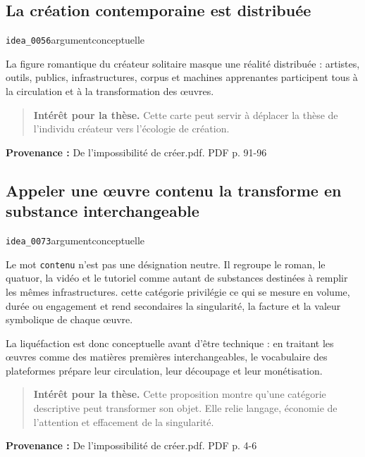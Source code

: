 \documentclass[10pt,a4paper]{article}
\begin{document}
\subsection{La création contemporaine est distribuée}
{\small\color{metadata} \texttt{idea\_0056}\quad\textbullet\quad argument\quad\textbullet\quad conceptuelle\par}

La figure romantique du créateur solitaire masque une réalité distribuée : artistes, outils, publics, infrastructures, corpus et machines apprenantes participent tous à la circulation et à la transformation des œuvres.

\begin{quote}
\textbf{Intérêt pour la thèse.} Cette carte peut servir à déplacer la thèse de l'individu créateur vers l'écologie de création.
\end{quote}
{\footnotesize\color{metadata}\textbf{Provenance :} De l'impossibilité de créer.pdf. PDF p. 91-96\par}

\subsection{Appeler une œuvre contenu la transforme en substance interchangeable}
{\small\color{metadata} \texttt{idea\_0073}\quad\textbullet\quad argument\quad\textbullet\quad conceptuelle\par}

Le mot \texttt{contenu} n'est pas une désignation neutre. Il regroupe le roman, le quatuor, la vidéo et le tutoriel comme autant de substances destinées à remplir les mêmes infrastructures. cette catégorie privilégie ce qui se mesure en volume, durée ou engagement et rend secondaires la singularité, la facture et la valeur symbolique de chaque œuvre.

La liquéfaction est donc conceptuelle avant d'être technique : en traitant les œuvres comme des matières premières interchangeables, le vocabulaire des plateformes prépare leur circulation, leur découpage et leur monétisation.

\begin{quote}
\textbf{Intérêt pour la thèse.} Cette proposition montre qu'une catégorie descriptive peut transformer son objet. Elle relie langage, économie de l'attention et effacement de la singularité.
\end{quote}
{\footnotesize\color{metadata}\textbf{Provenance :} De l'impossibilité de créer.pdf. PDF p. 4-6\par}
\end{document}
